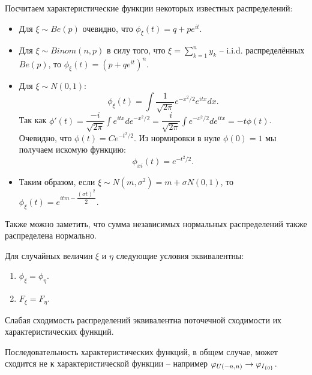 \begin{example}
    Посчитаем характеристические функции некоторых известных распределений:
    \begin{itemize}
        \item Для $\xi \sim Be(p)$ очевидно, что $\phi_\xi(t) = q + pe^{it}$.
        \item Для $\xi \sim Binom(n, p)$ в силу того, что $\xi = \sum\limits_{k = 1}^n y_k$ -- i.i.d. распределённых $Be(p)$, то $\phi_\xi(t) = (p + qe^{it})^n$.
        \item Для $\xi \sim N(0, 1)$:
        \[
            \phi_{\xi}(t) = \int \dfrac{1}{\sqrt {2\pi}} e^{-x^2/2} e^{itx}dx.
        \]
        Так как $\phi'(t) = \dfrac{-i}{\sqrt {2\pi}} \int e^{itx}de^{-x^2/2} = \dfrac{i}{\sqrt {2\pi}} \int e^{-x^2/2}de^{itx} = -t \phi(t)$.
        Очевидно, что $\phi(t) = Ce^{-t^2/2}$. Из нормировки в нуле $\phi(0) = 1$ мы получаем искомую функцию:
        \[
            \phi_{xi}(t) = e^{-t^2/2}.
        \]
        \item Таким образом, если $\xi \sim N(m, \sigma^2) = m + \sigma N(0, 1)$, то $\phi_\xi(t) = e^{itm - \dfrac{(\sigma t)^2}{2}}$.
    \end{itemize}
\end{example}
\begin{note}
    Также можно заметить, что сумма независимых нормальных распределений также распределена нормально.
\end{note}
\begin{theorem}
    Для случайных величин $\xi$ и $\eta$ следующие условия эквивалентны:
    \begin{enumerate}
        \item $\phi_\xi = \phi_\eta$.
        \item $F_{\xi} = F_{\eta}$.
    \end{enumerate}
\end{theorem}
\begin{note}
    Слабая сходимость распределений эквивалентна поточечной сходимости их характеристических функций.
\end{note}
\begin{note}
    Последовательность характеристических функций, в общем случае, может сходится не к характеристической функции -- например $\varphi_{U(-n, n)} \rightarrow \varphi_{I_{\{0\}}}$.
\end{note}

